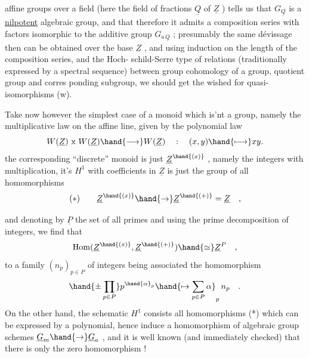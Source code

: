 
affine groups over a field (here the field of fractions $\underline{Q}$ of $\underline{Z}$ ) tells
us that $G_{\underline{Q}}$ is a \uline{nilpotent} algebraic group,  and that therefore it admits
a composition series with factors isomorphic to the additive group $G_{a\,\underline{Q}}$ ;
presumably the same dévissage then can be obtained over the base $\underline{Z}$ ,  and
using induction on the length of the composition series,  and the Hoch-%
schild-Serre type of relations (traditionally expressed by a spectral
sequence)  between group cohomology of a group,  quotient group and corres
ponding subgroup,  we should get the wished for quasi-isomorphisms (w).

Take now however the simplest case of a monoid which is'nt a group,
namely the multiplicative law on the affine line,  given by the polynomial
law
\[ W(\underline{Z}) \text{ x } W(\underline{Z}) \hand{\longrightarrow} W(\underline{Z}) \quad : \quad (x,y) \hand{\longmapsto} xy. \]
\margin{\textcircled{$\times$}} the corresponding ``discrete'' monoid is just $\underline{Z}^{\hand{(x)}}$ ,  namely the integers
with multiplication,  it's $H^{1}$ with coefficients in $\underline{Z}$  is just the group
of all homomorphisms
\[ (*) \qquad \underline{Z}^{\hand{(x)}} \hand{\to} \underline{Z}^{\hand{(+)}} = \underline{Z} \quad , \]

and denoting by $\underline{P}$ the set of all primes and using the prime decomposition
of integers,  we find that
\[ \mathrm{Hom}(\underline{Z}^{\hand{(x)}},\underline{Z}^{\hand{(+)}}) \hand{\simeq} \underline{Z}^{P} \quad , \]
to a family $(n_{p})_{p \in P}$ of integers being associated the homomorphism
\[ \hand{\pm\prod_{p\in P}} p^{\hand{\alpha}_{p}} \hand{\mapsto \sum_{p\in P} \alpha}_{p}\, n_{p} \quad . \]
On the other hand,  the schematic $H^{1}$ consists  all  homomorphisms (*)
which can be expressed by a polynomial,  hence induce a homomorphism of
algebraic group schemes  $\underline{G}_{m} \hand{\to} \underline{G}_{a}$ ,  and it is well known (and immediately
checked) that there is only the zero homomorphism !


